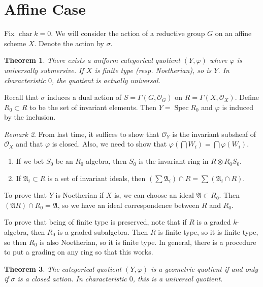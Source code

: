 \documentclass[leqno, openany]{memoir}
\newtheorem{thm}{Theorem}[section]
\theoremstyle{definition}
\theoremstyle{remark}
\newtheorem{rmk}[thm]{Remark}
\theoremstyle{plain}
\theoremstyle{definition}
\theoremstyle{remark}
\newcommand{\mc}[1]{\mathcal{#1}}
\newcommand{\mf}[1]{\mathfrak{#1}}
\DeclareMathOperator{\Spec}{Spec}
\begin{document}
\section{Affine Case}%

Fix $\operatorname{char} k = 0$. We will consider the action of a reductive
group $G$ on an affine scheme $X$. Denote the action by $\sigma$.

\begin{thm} There exists a uniform categorical quotient $(Y, \varphi)$ where
$\varphi$ is universally submersive. If $X$ is finite type (resp. Noetherian),
so is $Y$. In characteristic $0$, the quotient is actually universal.
\end{thm}

Recall that $\sigma$ induces a dual action of $S = \Gamma(G, \mc{O}_G)$ on $R =
\Gamma(X, \mc{O}_X)$. Define $R_0 \subset R$ to be the set of invariant
elements. Then $Y = \Spec R_0$ and $\varphi$ is induced by the inclusion.

\begin{rmk} From last time, it suffices to show that $\mc{O}_Y$ is the
invariant subsheaf of $\mc{O}_X$ and that $\varphi$ is closed. Also, we need to
show that $\varphi(\bigcap W_i) = \bigcap \varphi(W_i)$.  \end{rmk}

\begin{enumerate} \item If we bet $S_0$ be an $R_0$-algebra, then $S_0$ is the
invariant ring in $R \otimes R_0 S_0$.  \item If $\mf{A}_i \subset R$ is a set
of invariant ideals, then $(\sum \mf{A}_i) \cap R = \sum(\mf{A}_i \cap R)$.
\end{enumerate}

To prove that $Y$ is Noetherian if $X$ is, we can choose an ideal $\mf{A}
\subset R_0$. Then $(\mf{A} R) \cap R_0 = \mf{A}$, so we have an ideal
correspondence between $R$ and $R_0$.

To prove that being of finite type is preserved, note that if $R$ is a graded
$k$-algebra, then $R_0$ is a graded subalgebra. Then $R$ is finite type, so it
is finite type, so then $R_0$ is also Noetherian, so it is finite type. In
general, there is a procedure to put a grading on any ring so that this works.

\begin{thm} The categorical quotient $(Y, \varphi)$ is a geometric quotient if
and only if $\sigma$ is a closed action. In characteristic $0$, this is a
universal quotient.  \end{thm}
\end{document}
